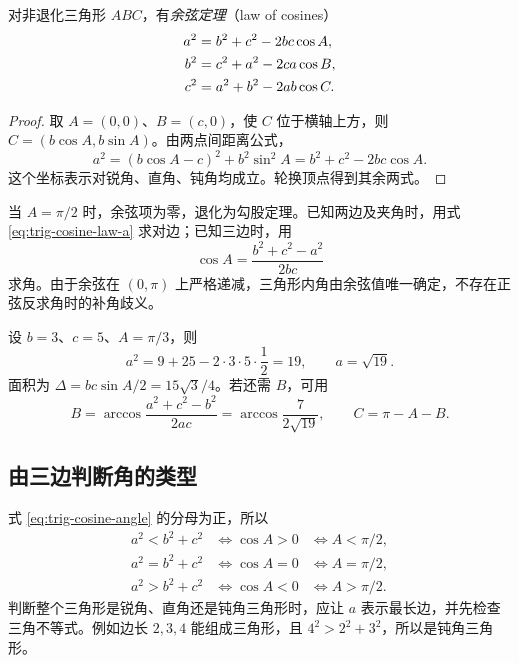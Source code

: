 \documentclass[UTF8,12pt,a4paper,fontset=fandol]{ctexart}
\begin{document}
\begin{theorem}[余弦定理]
对非退化三角形 $ABC$，有\emph{余弦定理}（law of cosines）
\begin{align}
  a^2&=b^2+c^2-2bc\cos A,\label{eq:trig-cosine-law-a}\\
  b^2&=c^2+a^2-2ca\cos B,\notag\\
  c^2&=a^2+b^2-2ab\cos C.\notag
\end{align}
\end{theorem}

\begin{proof}
取 $A=(0,0)$、$B=(c,0)$，使 $C$ 位于横轴上方，则 $C=(b\cos A,b\sin A)$。由两点间距离公式，
\[
  a^2=(b\cos A-c)^2+b^2\sin^2A
  =b^2+c^2-2bc\cos A.
\]
这个坐标表示对锐角、直角、钝角均成立。轮换顶点得到其余两式。
\end{proof}

当 $A=\pi/2$ 时，余弦项为零，退化为勾股定理。已知两边及夹角时，用式 \eqref{eq:trig-cosine-law-a} 求对边；已知三边时，用
\begin{equation}\label{eq:trig-cosine-angle}
  \boxed{\cos A=\frac{b^2+c^2-a^2}{2bc}}
\end{equation}
求角。由于余弦在 $(0,\pi)$ 上严格递减，三角形内角由余弦值唯一确定，不存在正弦反求角时的补角歧义。

\begin{example}[两边及夹角求第三边]
设 $b=3$、$c=5$、$A=\pi/3$，则
\[
  a^2=9+25-2\cdot3\cdot5\cdot\frac12=19,
  \qquad a=\sqrt{19}.
\]
面积为 $\Delta=bc\sin A/2=15\sqrt3/4$。若还需 $B$，可用
\[
  B=\arccos\frac{a^2+c^2-b^2}{2ac}
   =\arccos\frac7{2\sqrt{19}},\qquad C=\pi-A-B.
\]
\end{example}

\subsection{由三边判断角的类型}

式 \eqref{eq:trig-cosine-angle} 的分母为正，所以
\[
\begin{array}{lll}
  a^2<b^2+c^2 &\Longleftrightarrow \cos A>0 &\Longleftrightarrow A<\pi/2,\\
  a^2=b^2+c^2 &\Longleftrightarrow \cos A=0 &\Longleftrightarrow A=\pi/2,\\
  a^2>b^2+c^2 &\Longleftrightarrow \cos A<0 &\Longleftrightarrow A>\pi/2.
\end{array}
\]
判断整个三角形是锐角、直角还是钝角三角形时，应让 $a$ 表示最长边，并先检查三角不等式。例如边长 $2,3,4$ 能组成三角形，且 $4^2>2^2+3^2$，所以是钝角三角形。
\end{document}
